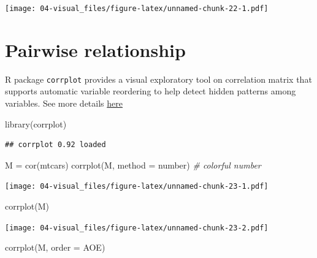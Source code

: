 \documentclass[
]{book}
\newenvironment{Shaded}{\begin{snugshade}}{\end{snugshade}}
\newcommand{\AttributeTok}[1]{\textcolor[rgb]{0.77,0.63,0.00}{#1}}
\newcommand{\CommentTok}[1]{\textcolor[rgb]{0.56,0.35,0.01}{\textit{#1}}}
\newcommand{\FunctionTok}[1]{\textcolor[rgb]{0.00,0.00,0.00}{#1}}
\newcommand{\NormalTok}[1]{#1}
\newcommand{\OtherTok}[1]{\textcolor[rgb]{0.56,0.35,0.01}{#1}}
\newcommand{\StringTok}[1]{\textcolor[rgb]{0.31,0.60,0.02}{#1}}
\begin{document}
\texttt{[image: 04-visual\_files/figure-latex/unnamed-chunk-22-1.pdf]}

\hypertarget{pairwise-relationship}{%
\section{Pairwise relationship}\label{pairwise-relationship}}

R package \texttt{corrplot} provides a visual exploratory tool on correlation matrix that supports automatic variable reordering to help detect hidden patterns among variables. See more details \href{https://cran.r-project.org/web/packages/corrplot/vignettes/corrplot-intro.html}{here}

\begin{Shaded}
\begin{Highlighting}[]
\FunctionTok{library}\NormalTok{(corrplot)}
\end{Highlighting}
\end{Shaded}

\begin{verbatim}
## corrplot 0.92 loaded
\end{verbatim}

\begin{Shaded}
\begin{Highlighting}[]
\NormalTok{M }\OtherTok{=} \FunctionTok{cor}\NormalTok{(mtcars)}
\FunctionTok{corrplot}\NormalTok{(M, }\AttributeTok{method =} \StringTok{\textquotesingle{}number\textquotesingle{}}\NormalTok{) }\CommentTok{\# colorful number}
\end{Highlighting}
\end{Shaded}

\texttt{[image: 04-visual\_files/figure-latex/unnamed-chunk-23-1.pdf]}

\begin{Shaded}
\begin{Highlighting}[]
\FunctionTok{corrplot}\NormalTok{(M)}
\end{Highlighting}
\end{Shaded}

\texttt{[image: 04-visual\_files/figure-latex/unnamed-chunk-23-2.pdf]}

\begin{Shaded}
\begin{Highlighting}[]
\FunctionTok{corrplot}\NormalTok{(M, }\AttributeTok{order =} \StringTok{\textquotesingle{}AOE\textquotesingle{}}\NormalTok{)}
\end{Highlighting}
\end{Shaded}
\end{document}
